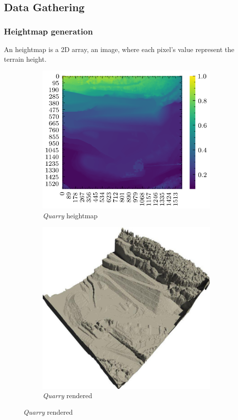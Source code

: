 \documentclass[../document.tex]{subfiles}
\begin{document}
\subsection{Data Gathering}
\subsubsection{Heightmap generation}
An heightmap is a 2D array, an image, where each pixel's value represent the terrain height.

\begin{figure}[H]
    \centering
        \begin{subfigure}[b]{0.45\textwidth}
            \includegraphics[width=\textwidth]{../img/hm/querry-big-10.png}
            \caption{\emph{Quarry} heightmap}
        \end{subfigure}
        \begin{subfigure}[b]{0.45\linewidth}
            \includegraphics[width=\textwidth]{../img/quarry-rendered.png}
            \caption{\emph{Quarry} rendered}
            \end{subfigure}    
    \end{figure}
\end{document}
